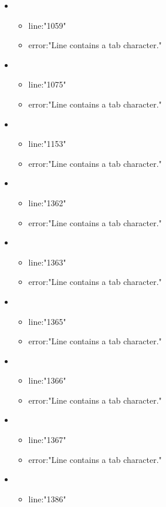 \begin{itemize}
	\item 
	\begin{itemize} 
		\item line:"1059" 
		\item error:"Line contains a tab character." 
	\end{itemize}
	\item 
	\begin{itemize} 
		\item line:"1075" 
		\item error:"Line contains a tab character." 
	\end{itemize}
	\item 
	\begin{itemize} 
		\item line:"1153" 
		\item error:"Line contains a tab character." 
	\end{itemize}
	\item 
	\begin{itemize} 
		\item line:"1362" 
		\item error:"Line contains a tab character." 
	\end{itemize}
	\item 
	\begin{itemize} 
		\item line:"1363" 
		\item error:"Line contains a tab character." 
	\end{itemize}
	\item 
	\begin{itemize} 
		\item line:"1365" 
		\item error:"Line contains a tab character." 
	\end{itemize}
	\item 
	\begin{itemize} 
		\item line:"1366" 
		\item error:"Line contains a tab character." 
	\end{itemize}
	\item 
	\begin{itemize} 
		\item line:"1367" 
		\item error:"Line contains a tab character." 
	\end{itemize}
	\item 
	\begin{itemize} 
		\item line:"1386" 

\end{itemize}
\end{itemize}
